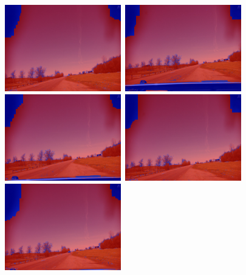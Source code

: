 \documentclass[a4paper,twoside,10pt]{article}
\begin{document}
\begin{figure}
	\centering
  \includegraphics[width=0.45\textwidth]{result_1.png}\ 
  \includegraphics[width=0.45\textwidth]{result_3.png}\ 
  \\
  \includegraphics[width=0.45\textwidth]{result_5.png}\ 
  \includegraphics[width=0.45\textwidth]{result_7.png}\ 
  \\
  \includegraphics[width=0.45\textwidth]{result_9.png}

\end{figure}
\end{document}
